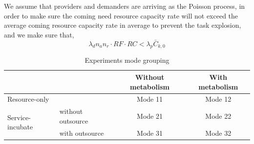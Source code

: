 We assume that providers and demanders are arriving as the Poisson process, in order to make sure the coming need resource capacity rate will not exceed the average coming resource capacity rate in average to prevent the task explosion, and we make sure that,
\begin{equation}
\lambda_d n_a n_r \cdot RF \cdot RC < \lambda_p \bar C_{k,0} \label{eq:balance}
\end{equation}


\begin{table}[htbp]
  \centering
  \scriptsize
  \caption{Experiments mode grouping}
    \begin{tabular}{llcc}
    \toprule
          &       & Without metabolism & With metabolism \\
    \midrule
    \multicolumn{2}{l}{Resource-only} & Mode 11 & Mode 12 \\\hline
    \multicolumn{1}{l}{\multirow{2}[0]{*}{Service-incubate}} & without outsource & Mode 21 &Mode 22 \\\cline{2-4}
    \multicolumn{1}{l}{} & with outsource & Mode 31 & Mode 32 \\
    \bottomrule
    \end{tabular}%
  \label{tab:grouping}%
\end{table}%

